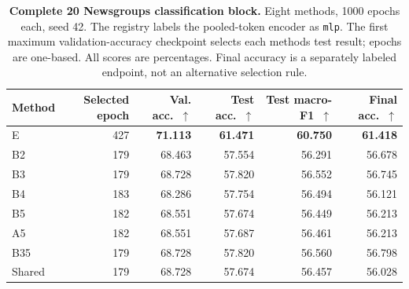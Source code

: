 \begin{table}[!htbp]
\centering
\caption{\textbf{Complete 20 Newsgroups classification block.} Eight methods, 1000 epochs each, seed 42. The registry labels the pooled-token encoder as \texttt{mlp}. The first maximum validation-accuracy checkpoint selects each method\textquotesingle s test result; epochs are one-based. All scores are percentages. Final accuracy is a separately labeled endpoint, not an alternative selection rule.}
\label{tab:revision-text-audit}
\footnotesize\setlength{\tabcolsep}{5pt}\renewcommand{\arraystretch}{1.12}
\begin{tabular}{lrrrrr}
\toprule
Method & Selected epoch & Val. acc.\ $\uparrow$ & Test acc.\ $\uparrow$ & Test macro-F1\ $\uparrow$ & Final acc.\ $\uparrow$ \\
\midrule
E & 427 & \textbf{71.113} & \textbf{61.471} & \textbf{60.750} & \textbf{61.418} \\
B2 & 179 & 68.463 & 57.554 & 56.291 & 56.678 \\
B3 & 179 & 68.728 & 57.820 & 56.552 & 56.745 \\
B4 & 183 & 68.286 & 57.754 & 56.494 & 56.121 \\
\rowcolor{oursbg}
B5 & 182 & 68.551 & 57.674 & 56.449 & 56.213 \\
A5 & 182 & 68.551 & 57.687 & 56.461 & 56.213 \\
B35 & 179 & 68.728 & 57.820 & 56.560 & 56.798 \\
Shared & 179 & 68.728 & 57.674 & 56.457 & 56.028 \\
\bottomrule
\end{tabular}
\end{table}
